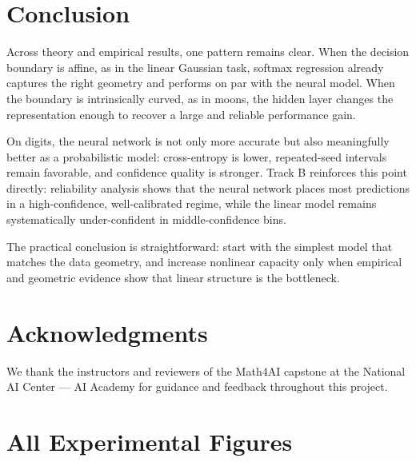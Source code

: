 \documentclass[sigconf,screen,nonacm]{acmart}
\begin{document}
\section{Conclusion}

Across theory and empirical results, one pattern remains clear. When the decision boundary is affine, as in the linear Gaussian task, softmax regression already captures the right geometry and performs on par with the neural model. When the boundary is intrinsically curved, as in moons, the hidden layer changes the representation enough to recover a large and reliable performance gain.

On digits, the neural network is not only more accurate but also meaningfully better as a probabilistic model: cross-entropy is lower, repeated-seed intervals remain favorable, and confidence quality is stronger. Track B reinforces this point directly: reliability analysis shows that the neural network places most predictions in a high-confidence, well-calibrated regime, while the linear model remains systematically under-confident in middle-confidence bins.

The practical conclusion is straightforward: start with the simplest model that matches the data geometry, and increase nonlinear capacity only when empirical and geometric evidence show that linear structure is the bottleneck.


\section*{Acknowledgments}

We thank the instructors and reviewers of the Math4AI capstone at the National AI Center --- AI Academy for guidance and feedback throughout this project.




\appendix

\section{All Experimental Figures}
\label{app:figures}
\end{document}
